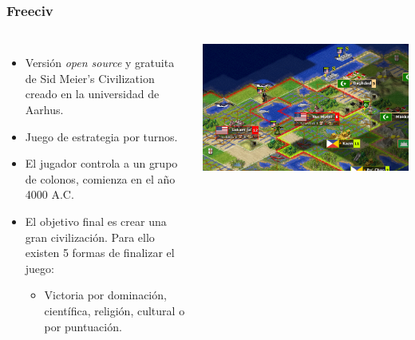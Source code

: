 \begin{frame}
	\frametitle{Freeciv}

	\begin{columns}
		
		\begin{itemize}
			\item<1-> Versión \textcolor{UDCpink}{\textit{open source}} y \textcolor{UDCpink}{gratuita} de Sid Meier's Civilization creado en la universidad de Aarhus.
			
			\vspace{1em}
			
			\item<2-> Juego de \textcolor{UDCpink}{estrategia por turnos}.
			
			\vspace{1em}
			
			\item<3-> El jugador controla a un \textcolor{UDCpink}{grupo de colonos}, comienza en el año \textcolor{UDCpink}{4000 A.C}.
			
			\vspace{1em}
			
			\item<4-> El objetivo final es crear una \textcolor{UDCpink}{gran civilización}. Para ello existen \textcolor{UDCpink}{5 formas} de finalizar el juego:
			
			\vspace{0.5em}
			
			\begin{itemize}
				\item Victoria por \textcolor{UDCpink}{dominación}, \textcolor{UDCpink}{científica}, \textcolor{UDCpink}{religión}, \textcolor{UDCpink}{cultural} o \textcolor{UDCpink}{por puntuación}.
			\end{itemize}
		\end{itemize}

		\includegraphics[width=\textwidth]{images/freeciv-example.png}
	\end{columns}

\end{frame}


